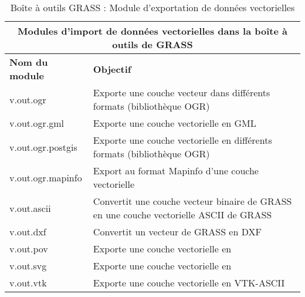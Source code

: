 \begin{table}[H]
\centering
 \begin{tabular}{|p{4cm}|p{10cm}|}
  \hline \multicolumn{2}{|c|}{\textbf{Modules d'import de données vectorielles dans la boîte à outils de GRASS}} \\ 
  \hline \textbf{Nom du module} & \textbf{Objectif} \\
  \hline v.out.ogr & Exporte une couche vecteur dans différents formats (bibliothèque OGR) \\
  \hline v.out.ogr.gml & Exporte une couche vectorielle en GML \\
  \hline v.out.ogr.postgis & Exporte une couche vectorielle en différents formats (bibliothèque OGR) \\
  \hline v.out.ogr.mapinfo & Export au format Mapinfo d'une couche vectorielle\\
  \hline v.out.ascii & Convertit une couche vecteur binaire de GRASS en une couche vectorielle ASCII de GRASS\\
  \hline v.out.dxf & Convertit un vecteur de GRASS en DXF \\
   \hline v.out.pov & Exporte une couche vectorielle en  \\
   \hline v.out.svg & Exporte une couche vectorielle en  \\
   \hline v.out.vtk & Exporte une couche vectorielle en VTK-ASCII \\
\hline
\end{tabular}
\caption{Boîte à outils GRASS : Module d'exportation de données vectorielles}
\end{table}

